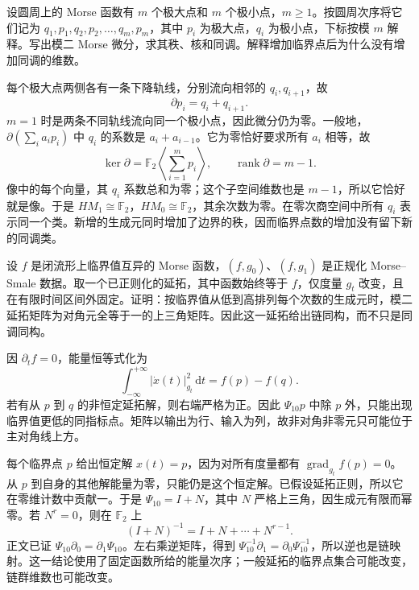 \begin{exercise}\label{g2:ex:many-critical-circle-complex}
	设圆周上的 Morse 函数有 \(m\) 个极大点和 \(m\) 个极小点，\(m\ge1\)。按圆周次序将它们记为 \(q_1,p_1,q_2,p_2,\ldots,q_m,p_m\)，其中 \(p_i\) 为极大点，\(q_i\) 为极小点，下标按模 \(m\) 解释。写出模二 Morse 微分，求其秩、核和同调。解释增加临界点后为什么没有增加同调的维数。
\end{exercise}
\begin{solution}
	每个极大点两侧各有一条下降轨线，分别流向相邻的 \(q_i,q_{i+1}\)，故
	\[
		\partial p_i=q_i+q_{i+1}.
	\]
	\(m=1\) 时是两条不同轨线流向同一个极小点，因此微分仍为零。一般地，\(\partial(\sum_i a_ip_i)\) 中 \(q_i\) 的系数是 \(a_i+a_{i-1}\)。它为零恰好要求所有 \(a_i\) 相等，故
	\[
		\ker\partial=\mathbb F_2\left\langle\sum_{i=1}^m p_i\right\rangle,
		\qquad\operatorname{rank}\partial=m-1.
	\]
	像中的每个向量，其 \(q_i\) 系数总和为零；这个子空间维数也是 \(m-1\)，所以它恰好就是像。于是 \(HM_1\cong\mathbb F_2\)，\(HM_0\cong\mathbb F_2\)，其余次数为零。在零次商空间中所有 \(q_i\) 表示同一个类。新增的生成元同时增加了边界的秩，因而临界点数的增加没有留下新的同调类。
\end{solution}

\begin{exercise}\label{g2:ex:fixed-function-continuation-triangular}
	设 \(f\) 是闭流形上临界值互异的 Morse 函数，\((f,g_0)\)、\((f,g_1)\) 是正规化 Morse--Smale 数据。取一个已正则化的延拓，其中函数始终等于 \(f\)，仅度量 \(g_t\) 改变，且在有限时间区间外固定。证明：按临界值从低到高排列每个次数的生成元时，模二延拓矩阵为对角元全等于一的上三角矩阵。因此这一延拓给出链同构，而不只是同调同构。
\end{exercise}
\begin{solution}
	因 \(\partial_t f=0\)，能量恒等式化为
	\[
		\int_{-\infty}^{+\infty}|\dot x(t)|_{g_t}^2\,\mathrm dt=f(p)-f(q).
	\]
	若有从 \(p\) 到 \(q\) 的非恒定延拓解，则右端严格为正。因此 \(\Psi_{10}p\) 中除 \(p\) 外，只能出现临界值更低的同指标点。矩阵以输出为行、输入为列，故非对角非零元只可能位于主对角线上方。

	每个临界点 \(p\) 给出恒定解 \(x(t)=p\)，因为对所有度量都有 \(\operatorname{grad}_{g_t}f(p)=0\)。从 \(p\) 到自身的其他解能量为零，只能仍是这个恒定解。已假设延拓正则，所以它在零维计数中贡献一。于是 \(\Psi_{10}=I+N\)，其中 \(N\) 严格上三角，因生成元有限而幂零。若 \(N^r=0\)，则在 \(\mathbb F_2\) 上
	\[
		(I+N)^{-1}=I+N+\cdots+N^{r-1}.
	\]
	正文已证 \(\Psi_{10}\partial_0=\partial_1\Psi_{10}\)。左右乘逆矩阵，得到 \(\Psi_{10}^{-1}\partial_1=\partial_0\Psi_{10}^{-1}\)，所以逆也是链映射。这一结论使用了固定函数所给的能量次序；一般延拓的临界点集合可能改变，链群维数也可能改变。
\end{solution}


